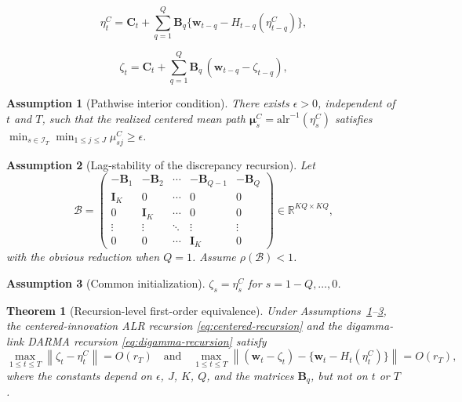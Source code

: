 \documentclass[10pt,a4paper]{amsart}
\newtheorem{assumption}{Assumption}
\newtheorem{thm}{Theorem}
\newcommand{\R}{\mathbb{R}}
\newcommand{\alrinv}{\mathrm{alr}^{-1}}
\newcommand{\bfB}{\mathbf{B}}
\newcommand{\bfC}{\mathbf{C}}
\newcommand{\bfI}{\mathbf{I}}
\newcommand{\bfmu}{\boldsymbol{\mu}}
\newcommand{\bfw}{\mathbf{w}}
\newcommand{\norm}[1]{\left\lVert#1\right\rVert}
\begin{document}
\begin{equation}\label{eq:centered-recursion}
\eta_t^{C}
= \bfC_t+
\sum_{q=1}^Q \bfB_q
\{\bfw_{t-q}-H_{t-q}(\eta_{t-q}^{C})\},\tag{C}
\end{equation}

\begin{equation}\label{eq:digamma-recursion}
\zeta_t = \bfC_t + \sum_{q=1}^Q \bfB_q\,(\bfw_{t-q}-\zeta_{t-q}),\tag{D}
\end{equation}

\begin{assumption}[Pathwise interior condition]\label{ass:interior}
There exists $\epsilon>0$, independent of $t$ and $T$, such that the realized centered mean path $\bfmu_s^{C}=\alrinv(\eta_s^{C})$ satisfies $\min_{s\in\mathcal{I}_T}\min_{1\le j\le J}\mu_{sj}^{C}\ge\epsilon$.
\end{assumption}

\begin{assumption}[Lag-stability of the discrepancy recursion]\label{ass:stab}
Let
\[
\mathcal{B}=\begin{pmatrix}
-\bfB_1 & -\bfB_2 & \cdots & -\bfB_{Q-1} & -\bfB_Q\\
\bfI_K  & 0    & \cdots & 0        & 0\\
0    & \bfI_K  & \cdots & 0        & 0\\
\vdots & \vdots & \ddots & \vdots & \vdots\\
0    & 0    & \cdots & \bfI_K      & 0
\end{pmatrix}\in\R^{KQ\times KQ},
\]
with the obvious reduction when $Q=1$. Assume $\rho(\mathcal{B})<1$.
\end{assumption}

\begin{assumption}[Common initialization]\label{ass:init}
$\zeta_s=\eta_s^{C}$ for $s=1-Q,\ldots,0$.
\end{assumption}

\begin{thm}[Recursion-level first-order equivalence]\label{thm:equiv}
Under Assumptions~\ref{ass:interior}--\ref{ass:init}, the centered-innovation ALR recursion \eqref{eq:centered-recursion} and the digamma-link DARMA recursion \eqref{eq:digamma-recursion} satisfy
\[
\max_{1\le t\le T}\norm{\zeta_t-\eta_t^{C}} = O(r_T)
\quad\text{and}\quad
\max_{1\le t\le T}\norm{(\bfw_t-\zeta_t)-\{\bfw_t-H_t(\eta_t^{C})\}}=O(r_T),
\]
where the constants depend on $\epsilon$, $J$, $K$, $Q$, and the matrices $\bfB_q$, but not on $t$ or $T$.
\end{thm}
\end{document}
